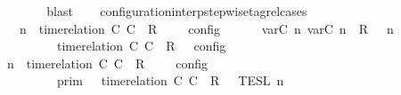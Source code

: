 \begin{isabellebody}
\ {\isacharasterisk}\isanewline
\ \ \ \ \ \ \isamarkupfalse%
\ blast\isanewline
\ \ \isamarkupfalse%
\isanewline
{}\isamarkupfalse%
%
\endisatagproof
{\isafoldproof}%
%
\isadelimproof
\isanewline
%
\endisadelimproof
\isanewline
{}\isamarkupfalse%
\ configuration{\isacharunderscore}interp{\isacharunderscore}stepwise{\isacharunderscore}tagrel{\isacharunderscore}cases{\isacharcolon}\isanewline
\ \ \ {\isacartoucheopen}{\isasymlbrakk}\ {\isasymGamma}{\isacharcomma}\ n\ {\isasymTurnstile}\ {\isacharparenleft}{\isacharparenleft}time{\isacharminus}relation\ {\isasymlfloor}C\ C\ {\isasymin}\ R{\isacharparenright}\ {\isacharhash}\ {\isasymPsi}{\isacharparenright}\ {\isasymtriangleright}\ {\isasymPhi}\ {\isasymrbrakk}\isactrlsub c\isactrlsub o\isactrlsub n\isactrlsub f\isactrlsub i\isactrlsub g\isanewline
\ \ \ \ {\isacharequal}\ {\isasymlbrakk}\ {\isacharparenleft}{\isacharparenleft}{\isasymlfloor}{\isasymtau}\isactrlsub v\isactrlsub a\isactrlsub r{\isacharparenleft}C\ n{\isacharparenright}{\isacharcomma}\ {\isasymtau}\isactrlsub v\isactrlsub a\isactrlsub r{\isacharparenleft}C\ n{\isacharparenright}{\isasymrfloor}\ {\isasymin}\ R{\isacharparenright}\ {\isacharhash}\ {\isasymGamma}{\isacharparenright}{\isacharcomma}\ n\isanewline
\ \ \ \ \ \ \ \ {\isasymTurnstile}\ {\isasymPsi}\ {\isasymtriangleright}\ {\isacharparenleft}{\isacharparenleft}time{\isacharminus}relation\ {\isasymlfloor}C\ C\ {\isasymin}\ R{\isacharparenright}\ {\isacharhash}\ {\isasymPhi}{\isacharparenright}\ {\isasymrbrakk}\isactrlsub c\isactrlsub o\isactrlsub n\isactrlsub f\isactrlsub i\isactrlsub g{\isacartoucheclose}\isanewline
%
\isadelimproof
%
\endisadelimproof
%
\isatagproof
{}\isamarkupfalse%
\ {\isacharminus}\isanewline
\ \ \isamarkupfalse%
\ {\isacartoucheopen}{\isasymlbrakk}\ {\isasymGamma}{\isacharcomma}\ n\ {\isasymTurnstile}\ {\isacharparenleft}time{\isacharminus}relation\ {\isasymlfloor}C\ C\ {\isasymin}\ R{\isacharparenright}\ {\isacharhash}\ {\isasymPsi}\ {\isasymtriangleright}\ {\isasymPhi}\ {\isasymrbrakk}\isactrlsub c\isactrlsub o\isactrlsub n\isactrlsub f\isactrlsub i\isactrlsub g\isanewline
\ \ \ \ \ \ \ \ {\isacharequal}\ {\isasymlbrakk}{\isasymlbrakk}\ {\isasymGamma}\ {\isasymrbrakk}{\isasymrbrakk}\isactrlsub p\isactrlsub r\isactrlsub i\isactrlsub m\ {\isasyminter}\ {\isasymlbrakk}{\isasymlbrakk}\ {\isacharparenleft}time{\isacharminus}relation\ {\isasymlfloor}C\ C\ {\isasymin}\ R{\isacharparenright}\ {\isacharhash}\ {\isasymPsi}\ {\isasymrbrakk}{\isasymrbrakk}\isactrlsub T\isactrlsub E\isactrlsub S\isactrlsub L\isactrlbsup {\isasymge}\ n\isactrlesup \isanewline

\end{isabellebody}
